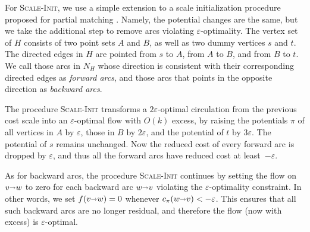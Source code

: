 \documentclass[a4paper,UKenglish]{socg-lipics-v2018}
\def\eps{\varepsilon}
\def\arcto{\mathord\shortrightarrow}
\def\arc#1#2{#1\arcto#2}
\def\supp{\operatorname{supp}}
\theoremstyle{plain}
\numberwithin{figure}{section}
\def\EMPH#1{\textcolor{BrickRed}{{\emph{#1}}}}
\begin{document}


For \textsc{Scale-Init}, we use a simple extension to a scale
initialization procedure proposed for partial matching \cite[Section~6.1]{GHKT17}.
Namely, the potential changes are the same, but we take the additional step
to remove arcs violating $\eps$-optimality.
The vertex set of $H$ consists of two point sets $A$ and $B$, as well as two dummy vertices $s$ and $t$.  The directed edges in $H$ are pointed from $s$ to $A$, from $A$ to $B$, and from $B$ to $t$.
We call those arcs in $N_H$ whose direction is consistent with their corresponding directed edges as \EMPH{forward arcs}, and those arcs that points in the opposite direction as \EMPH{backward arcs}.

The procedure \textsc{Scale-Init} transforms a $2\eps$-optimal circulation from the previous cost scale into an $\eps$-optimal flow with $O(k)$ excess, by raising the potentials $\pi$ of all vertices in $A$ by $\eps$, those in $B$ by $2\eps$, and the potential of $t$ by $3\eps$.
The potential of $s$ remains unchanged.
%
Now the reduced cost of every forward arc is dropped by $\eps$, and thus all the forward arcs have reduced cost at least~$-\eps$.

As for backward arcs, the procedure \textsc{Scale-Init} continues by setting the flow on $\arc vw$ to zero for each backward arc $\arc wv$ violating the $\eps$-optimality constraint.  In other words, we set $f(\arc vw) = 0$ whenever $c_\pi(\arc wv) < -\eps$.
This ensures that all such backward arcs are no longer residual, and therefore the flow (now with excess) is $\eps$-optimal.
\end{document}
